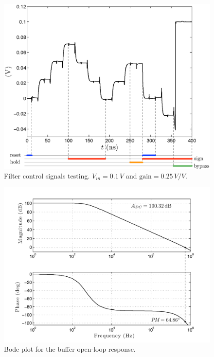 \begin{figure}[!t]
	\centering
	\includegraphics[width=5in]{./Test/test_filter_after_omni.eps}
	\caption{Filter control signals testing. $V_\textit{in}=0.1\,V$ and $\text{gain}=0.25\,V/V$.}\label{fig:test_filter_after_omni}
\end{figure}

\begin{figure}[!t]
	\centering
	\includegraphics[width=5.3in]{./Test/bode_buffer_post}
	\caption{Bode plot for the buffer open-loop response.}\label{fig:bode_buffer}
\end{figure}